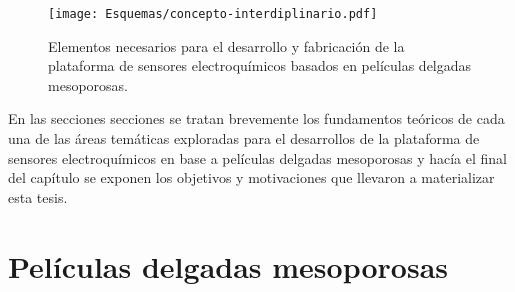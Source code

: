 	       \begin{figure}[ht!]
 				\begin{center}
 				\texttt{[image: Esquemas/concepto-interdiplinario.pdf]}
 				\caption[Plataforma de sensores. Diagrama de Venn.]{Elementos necesarios para el desarrollo y fabricación de la plataforma de sensores electroquímicos basados en películas delgadas mesoporosas.}
 		   		\label{fig:sensores}
 		    	\end{center}
 		    	\end{figure}
 	
 	En las secciones secciones se tratan brevemente los fundamentos teóricos de cada una de las áreas temáticas exploradas para el desarrollos de la plataforma de sensores electroquímicos en base a películas delgadas mesoporosas y hacía el final del capítulo se exponen los objetivos y motivaciones que llevaron a materializar esta tesis.

\section{Películas delgadas mesoporosas}\label{sec:mesoporosos}







				


